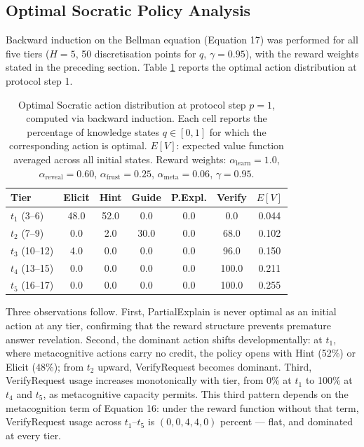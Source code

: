 \documentclass[fleqn,10pt]{wlscirep}
\begin{document}
\subsection*{Optimal Socratic Policy Analysis}

Backward induction on the Bellman equation (Equation 17) was performed for all five tiers ($H = 5$, 50 discretisation points for $q$, $\gamma = 0.95$), with the reward weights stated in the preceding section. Table \ref{tab:socratic_revised} reports the optimal action distribution at protocol step 1.

\begin{table}[H]
\centering
\caption{Optimal Socratic action distribution at protocol step $p{=}1$, computed via backward induction. Each cell reports the percentage of knowledge states $q \in [0,1]$ for which the corresponding action is optimal. $E[V]$: expected value function averaged across all initial states. Reward weights: $\alpha_{\text{learn}} = 1.0$, $\alpha_{\text{reveal}} = 0.60$, $\alpha_{\text{frust}} = 0.25$, $\alpha_{\text{meta}} = 0.06$, $\gamma = 0.95$.}
\label{tab:socratic_revised}
\begin{tabular}{lcccccc}
\hline
\textbf{Tier} & \textbf{Elicit} & \textbf{Hint} & \textbf{Guide} & \textbf{P.Expl.} & \textbf{Verify} & $E[V]$ \\
\hline
$t_1$ (3--6)   & 48.0 & 52.0 &  0.0 & 0.0 &   0.0 & 0.044 \\
$t_2$ (7--9)   &  0.0 &  2.0 & 30.0 & 0.0 &  68.0 & 0.102 \\
$t_3$ (10--12) &  4.0 &  0.0 &  0.0 & 0.0 &  96.0 & 0.150 \\
$t_4$ (13--15) &  0.0 &  0.0 &  0.0 & 0.0 & 100.0 & 0.211 \\
$t_5$ (16--17) &  0.0 &  0.0 &  0.0 & 0.0 & 100.0 & 0.255 \\
\hline
\end{tabular}
\end{table}

Three observations follow. First, PartialExplain is never optimal as an initial action at any tier, confirming that the reward structure prevents premature answer revelation. Second, the dominant action shifts developmentally: at $t_1$, where metacognitive actions carry no credit, the policy opens with Hint (52\%) or Elicit (48\%); from $t_2$ upward, VerifyRequest becomes dominant. Third, VerifyRequest usage increases monotonically with tier, from 0\% at $t_1$ to 100\% at $t_4$ and $t_5$, as metacognitive capacity permits. This third pattern depends on the metacognition term of Equation 16: under the reward function without that term, VerifyRequest usage across $t_1$--$t_5$ is $(0, 0, 4, 4, 0)$ percent --- flat, and dominated at every tier.
\end{document}
